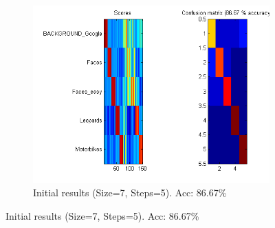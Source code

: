\begin{figure}[htb]
	\centering
	\begin{subfigure}[t]{0.4\textwidth}
		\includegraphics[width=\textwidth]{./img/ex1/eval-initial.png}
		\caption{Initial results (Size=7, Steps=5). Acc: 86.67\%}
	\end{subfigure}
	

\end{figure}
